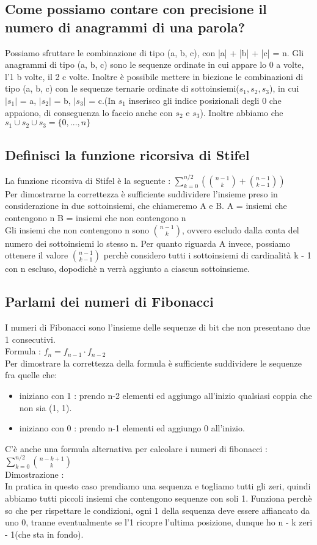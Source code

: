 \documentclass[a4paper,12pt]{report}
\begin{document}
	\subsection{Come possiamo contare con precisione il numero di anagrammi di una parola?}
	Possiamo sfruttare le combinazione di tipo (a, b, c), con |a| + |b| + |c| = n.
	Gli anagrammi di tipo (a, b, c)  sono le sequenze ordinate in cui appare lo 0 a volte, l'1 b volte, il 2 c volte.
	Inoltre è possibile mettere in biezione le combinazioni di tipo (a, b, c) con le sequenze ternarie ordinate di sottoinsiemi($s_1, s_2, s_3$), in cui $|s_1|$ = a, $|s_2|$ = b, $|s_3|$ = c.(In $s_1$ inserisco gli indice posizionali degli 0 che appaiono, di conseguenza lo faccio anche con $s_2$ e $s_3$).
	Inoltre abbiamo che $s_1 \cup s_2 \cup s_3 = \{0, ..., n\}$
	\subsection{Definisci la funzione ricorsiva di Stifel}
	La funzione ricorsiva di Stifel è la seguente : $\sum_{k = 0}^{n/2}(\binom{n - 1}{k} + \binom{n - 1}{k - 1})$ \\
	Per dimostrarne la correttezza è sufficiente suddividere l'insieme preso in considerazione in due sottoinsiemi, che chiameremo A e B.
	A = { insiemi che contengono n }
	B = { insiemi che non contengono n} \\
	Gli insiemi che non contengono n sono $\binom{n - 1}{k}$, ovvero escludo dalla conta del numero dei sottoinsiemi lo stesso n. Per quanto riguarda A invece, possiamo ottenere il valore $\binom{n - 1}{k - 1}$ perchè considero tutti i sottoinsiemi di cardinalità k - 1 con n escluso, dopodichè n verrà aggiunto a ciascun sottoinsieme.
	\subsection{Parlami dei numeri di Fibonacci}
	I numeri di Fibonacci sono l'insieme delle sequenze di bit che non presentano due 1 consecutivi. \\
	Formula : $f_n = f_{n - 1} \cdot f_{n - 2}$ \\
	Per dimostrare la correttezza della formula è sufficiente suddividere le sequenze fra quelle che: 
	\begin{itemize}
		\item iniziano con 1 : prendo n-2 elementi ed aggiungo all'inizio qualsiasi coppia che non sia (1, 1).  
		\item iniziano con 0 : prendo n-1 elementi ed aggiungo 0 all'inizio.
	\end{itemize}
	C'è anche una formula alternativa per calcolare i numeri di fibonacci : $\sum_{k = 0}^{n/2}\binom{n - k + 1}{k}$ \\
	Dimostrazione : \\
	In pratica in questo caso prendiamo una sequenza e togliamo tutti gli zeri, quindi abbiamo tutti piccoli insiemi che contengono sequenze con soli 1. Funziona perchè so che per rispettare le condizioni, ogni 1 della sequenza deve essere affiancato da uno 0, tranne eventualmente se l'1 ricopre l'ultima posizione, dunque ho n - k zeri - 1(che sta in fondo).
\end{document}

